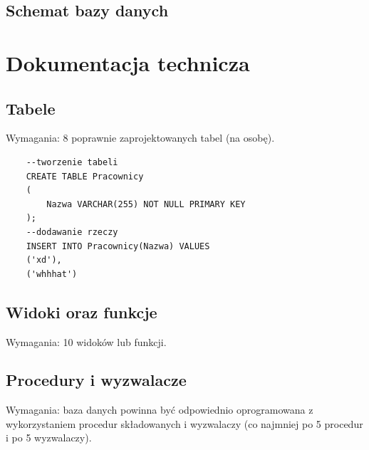 \documentclass[60pt]{article}
\begin{document}
\subsection{Schemat bazy danych}

\newpage
\section{Dokumentacja technicza}

\subsection{Tabele}

Wymagania: 8 poprawnie zaprojektowanych tabel (na osobę).

\begin{verbatim}
    --tworzenie tabeli
    CREATE TABLE Pracownicy
    (
        Nazwa VARCHAR(255) NOT NULL PRIMARY KEY
    );
    --dodawanie rzeczy
    INSERT INTO Pracownicy(Nazwa) VALUES
    ('xd'),
    ('whhhat')
\end{verbatim}
 
\subsection{Widoki oraz funkcje}

Wymagania: 10 widoków lub funkcji.

\subsection{Procedury i wyzwalacze}

Wymagania: baza danych powinna być odpowiednio oprogramowana z wykorzystaniem procedur składowanych i wyzwalaczy (co najmniej po 5 procedur i po 5 wyzwalaczy).
\end{document}
